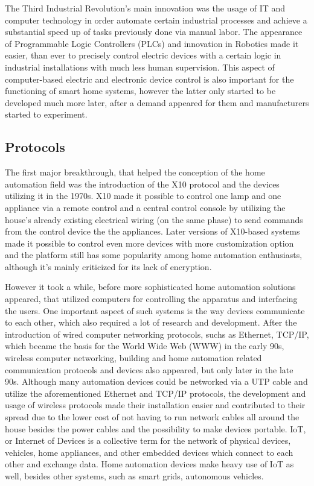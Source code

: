 The Third Industrial Revolution's main innovation was the usage of IT and computer technology in order automate certain industrial processes and achieve a substantial speed up of tasks previously done via manual labor. \cite{UpkeepIndRev}
The appearance of Programmable Logic Controllers (PLCs) and innovation in Robotics made it easier, than ever to precisely control electric devices with a certain logic in industrial installations with much less human supervision. This aspect of computer-based electric and electronic device control is also important for the functioning of smart home systems, however the latter only started to be developed much more later, after a demand appeared for them and manufacturers started to experiment. %

\subsection{Protocols}

The first major breakthrough, that helped the conception of the home automation field was the introduction of the X10 protocol and the devices utilizing it in the 1970s. X10 made it possible to control one lamp and one appliance via a remote control and a central control console by utilizing the house's already existing electrical wiring (on the same phase) to send commands from the control device the the appliances. Later versions of X10-based systems made it possible to control even more devices with more customization option and the platform still has some popularity among home automation enthusiasts, although it's mainly criticized for its lack of encryption. \cite{CavaX10}

However it took a while, before more sophisticated home automation solutions appeared, that utilized computers for controlling the apparatus and interfacing the users. One important aspect of such systems is the way devices communicate to each other, which also required a lot of research and development.
After the introduction of wired computer networking protocols, suchs as Ethernet, TCP/IP, which became the basis for the World Wide Web (WWW) in the early 90s, wireless computer networking, building and home automation related communication protocols and devices also appeared, but only later in the late 90s.
Although many automation devices could be networked via a UTP cable and utilize the aforementioned Ethernet and TCP/IP protocols, the development and usage of wireless protocols made their installation easier and contributed to their spread due to the lower cost of not having to run network cables all around the house besides the power cables and the possibility to make devices portable. IoT, or Internet of Devices is a collective term for the network of physical devices, vehicles, home appliances, and other embedded devices which connect to each other and exchange data. \cite{ShafiqIoTAttacks} Home automation devices make heavy use of IoT as well, besides other systems, such as smart grids, autonomous vehicles.


